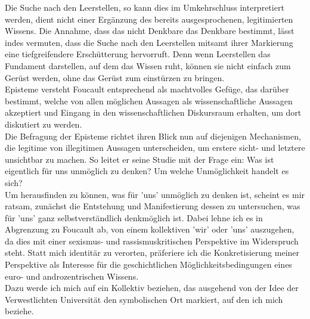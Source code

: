 \noindent Die Suche nach den
Leerstellen, so kann dies im Umkehrschluss interpretiert werden, dient nicht
einer Ergänzung des bereits ausgesprochenen, legitimierten Wissens. Die Annahme,
dass das nicht Denkbare das Denkbare bestimmt, lässt indes vermuten, dass die
Suche nach den Leerstellen mitsamt ihrer Markierung eine tiefgreifendere
Erschütterung hervorruft. Denn wenn Leerstellen das Fundament darstellen, auf
dem das Wissen ruht, können sie nicht einfach zum Gerüst werden, ohne das Gerüst
zum einstürzen zu bringen.\\
Episteme versteht Foucault entsprechend als machtvolles Gefüge, das darüber
bestimmt, welche von allen möglichen Aussagen als wissenschaftliche Aussagen
akzeptiert und Eingang in den wissenschaftlichen Diskursraum erhalten, um dort
diskutiert zu werden.\footnotemark {}\\

\noindent Die Befragung der Episteme richtet ihren Blick nun auf diejenigen Mechanismen,
die legitime von illegitimen Aussagen unterscheiden, um erstere sicht- und
letztere unsichtbar zu machen. So leitet er seine Studie mit der Frage ein:
\glqq Was ist eigentlich für uns unmöglich zu denken? Um welche Unmöglichkeit
handelt es sich? \grqq \footnotemark {}\\

\noindent Um herausfinden zu können, was für 'uns' unmöglich zu denken ist, scheint es mir
ratsam, zunächst die Entstehung und Manifestierung dessen zu untersuchen, was
für 'uns' ganz selbstverständlich denkmöglich ist. Dabei lehne ich es in
Abgrenzung zu Foucault ab, von einem kollektiven 'wir' oder 'uns' auszugehen, da
dies mit einer sexismus- und rassismuskritischen Perspektive im Widerspruch
steht. Statt mich identitär zu verorten, präferiere ich die Konkretisierung
meiner Perspektive als Interesse für die geschichtlichen Möglichkeitsbedingungen
eines euro- und androzentrischen Wissens. \\
Dazu werde ich mich auf ein Kollektiv
beziehen, das ausgehend von der Idee der \glqq Verwestlichten Universität \grqq 
\footnotemark {} den 
symbolischen Ort markiert, auf den ich mich beziehe.\\

